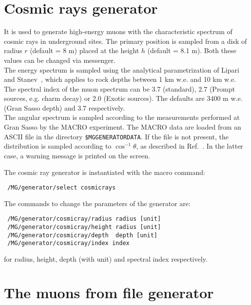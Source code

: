 \section{Cosmic rays generator}\label{Chapter:cosmic_rays}
It is used to generate high-energy muons with the characteristic spectrum 
of cosmic rays in underground sites. 
The primary position is sampled from a disk of radius $r$ (default = 8 m) placed 
at the height $h$ (default = 8.1 m). Both these values can be changed via messenger.\\ 
The energy spectrum is sampled using the analytical parametrization of  
Lipari and Stanev~\cite{Lipari:1997}, which applies to rock depths 
between 1 km w.e. and 10 km w.e. The spectral index of the muon spectrum can be 
3.7 (standard), 2.7 (Prompt sources, e.g. charm decay) or 2.0 (Exotic sources). The 
defaults are 3400 m w.e. (Gran Sasso depth) and 3.7 respectively. \\
The angular spectrum is sampled according to the measurements performed at Gran Sasso 
by the MACRO experiment. The MACRO data are loaded from an ASCII file in the 
directory \texttt{\$MGGENERATORDATA}. If the file is not present, the distribution is 
sampled according to $\cos^{-1}\theta$, as described in Ref.~\cite{Lipari:1997}. 
In the latter case, a warning message is printed on the screen.

The cosmic ray generator is instantiated with the macro command:

\begin{lstlisting}
 /MG/generator/select cosmicrays
\end{lstlisting}

The commands to change the parameters of the generator are:
\begin{lstlisting}
 /MG/generator/cosmicray/radius radius [unit]
 /MG/generator/cosmicray/height radius [unit]
 /MG/generator/cosmicray/depth  depth [unit]
 /MG/generator/cosmicray/index index
\end{lstlisting}

for radius, height, depth (with unit) and spectral index respectively.
 
\section{The muons from file generator}\label{Chapter:muons_from_file}

